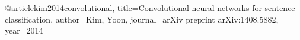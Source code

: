 
\begin{thereferences}{99}

@article{kim2014convolutional,
  title={Convolutional neural networks for sentence classification},
  author={Kim, Yoon},
  journal={arXiv preprint arXiv:1408.5882},
  year={2014}
}

\end{thereferences}
